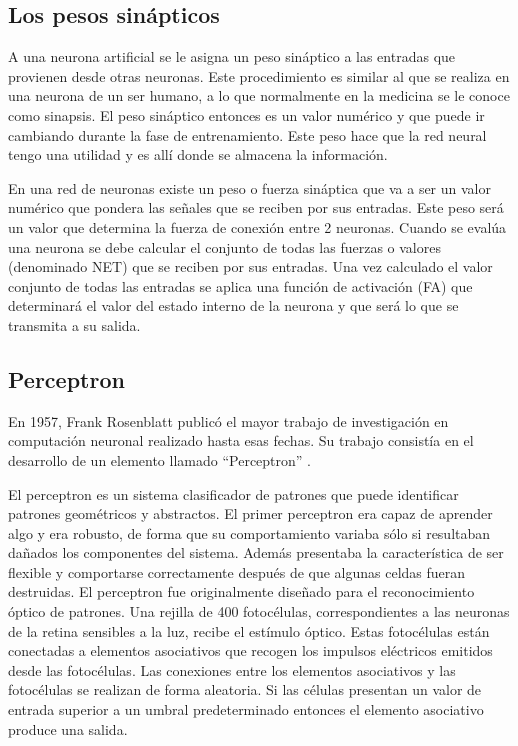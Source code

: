 \subsection{Los pesos sinápticos}
A una neurona artificial se le asigna un peso sináptico a las entradas que provienen desde otras neuronas. Este procedimiento es similar al que se realiza en una neurona de un ser humano, a lo que normalmente en la medicina se le conoce como sinapsis. El peso sináptico entonces es un valor numérico y que puede ir cambiando durante la fase de entrenamiento\cite{acevedo2017principios}. Este peso hace que la red neural tengo una utilidad y es allí donde se almacena la información.

En una red de neuronas existe un peso o fuerza sináptica que va a ser un valor numérico que pondera las señales que se reciben por sus entradas. Este peso será un valor que determina la fuerza de conexión entre 2 neuronas. Cuando se evalúa una neurona se debe calcular el conjunto de todas las fuerzas o valores (denominado NET) que se reciben por sus entradas. Una vez calculado el valor conjunto de todas las entradas se aplica una función de activación (FA) que determinará el valor del estado interno de la neurona y que será lo que se transmita a su salida\cite{pose2009introduccion}.

\subsection{Perceptron}
En 1957, Frank Rosenblatt publicó el mayor trabajo de investigación en computación neuronal realizado hasta esas fechas. Su trabajo consistía en el desarrollo de un
elemento llamado “Perceptron” \cite{olabe1998redes}.

\vspace{1\baselineskip}
El perceptron es un sistema clasificador de patrones que puede identificar patrones geométricos y abstractos. El primer perceptron era capaz de aprender algo y era robusto, de forma que su comportamiento variaba sólo si resultaban dañados los componentes del sistema. 
Además presentaba la característica de ser flexible y comportarse correctamente después de que algunas celdas fueran destruidas.
El perceptron fue originalmente diseñado para el reconocimiento óptico de patrones.
Una rejilla de 400 fotocélulas, correspondientes a las neuronas de la retina sensibles a la luz, recibe el estímulo óptico. Estas fotocélulas están conectadas a elementos asociativos que recogen los impulsos eléctricos emitidos desde las fotocélulas. Las
conexiones entre los elementos asociativos y las fotocélulas se realizan de forma aleatoria.
Si las células presentan un valor de entrada superior a un umbral predeterminado entonces el elemento asociativo produce una salida\cite{olabe1998redes}.


